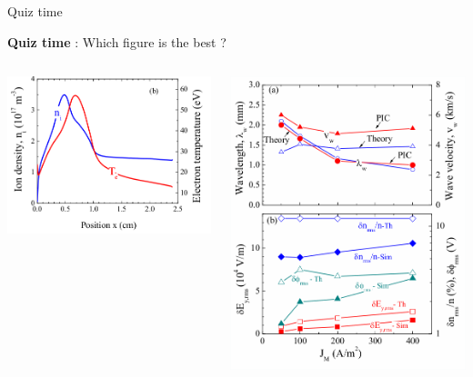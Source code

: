 \documentclass[sans, aspectratio=169]{beamer}
\begin{document}
\begin{frame}{Quiz time} 
	\begin{center}
	{\Large \textbf{Quiz time} : Which figure is the best ?}
	\end{center}
\end{frame}

\begin{frame}
	\begin{columns}
		\begin{column}{0.5\linewidth}
		\centering
		\includegraphics[width=0.8\linewidth]{proposition_from_students/I_like_antoine.png} 
		\end{column}
		\vline
		\begin{column}{0.5\linewidth}
		\centering
		\includegraphics[width=0.8\linewidth]{proposition_from_students/I_hate_Antoine.png} 
		\end{column}
	\end{columns}
\end{frame}
\end{document}

